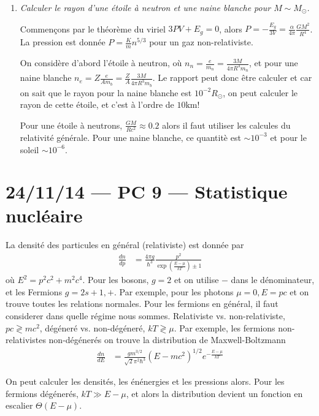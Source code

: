 \documentclass[10pt]{report}
\newcommand{\rd}[2]{\frac{d#1}{d#2}}
\begin{document}
\begin{enumerate}[1.]
    \item \emph{Calculer le rayon d'une \'etoile \`a neutron et une naine blanche pour $M \sim M_{\odot}$.}

        Commen\c{c}ons par le th\'eor\`eme du viriel $3PV + E_g = 0$, alors $P = -\frac{E_g}{3V} = \frac{\alpha}{4\pi}\frac{GM^2}{R^4}$. La pression est donn\'ee $P = \frac{K}{m}n^{5/3}$ pour un gaz non-relativiste.
        
        On consid\`ere d'abord l'\'etoile \`a neutron, o\`u $n_n = \frac{e}{m_n} = \frac{3M}{4\pi R^3 m_n}$, et pour une naine blanche $n_e = Z\frac{e}{Am_b} = \frac{Z}{A}\frac{3M}{4\pi R^3 m_b}$. Le rapport peut donc \^etre calculer et car on sait que le rayon pour la naine blanche est $10^{-2}R_{\odot}$, on peut calculer le rayon de cette \'etoile, et c'est \`a l'ordre de $10\mathrm{km}$!

        Pour une \'etoile \`a neutrons, $\frac{GM}{Rc^2} \approx 0.2$ alors il faut utiliser les calcules du relativit\'e g\'en\'erale. Pour une naine blanche, ce quantit\`e est $\sim 10^{-3}$ et pour le soleil $\sim10^{-6}$. 
\end{enumerate}
\chapter{24/11/14 --- PC 9 --- Statistique nucl\'eaire}

La densit\'e des particules en g\'en\'eral (relativiste) est donn\'ee par
\begin{align}
    \rd{n}{p} &= \frac{4\pi g}{\hbar^3}\frac{p^2}{\exp\left( \frac{E-\mu}{kT} \right) \pm 1}
\end{align}
o\`u $E^2 = p^2c^2 + m^2c^4$. Pour les bosons, $g=2$ et on utilise $-$ dans le d\'enominateur, et les Fermions $g=2s+1, +$. Par exemple, pour les photons $\mu = 0, E = pc$ et on trouve toutes les relations normales. Pour les fermions en g\'en\'eral, il faut considerer dans quelle r\'egime nous sommes. Relativiste vs. non-relativiste, $pc \gtrless mc^2$, d\'eg\'ener\'e vs. non-d\'eg\'ener\'e, $kT \gtrless \mu$. Par exemple, les fermions non-relativistes non-d\'eg\'ener\'es on trouve la distribution de Maxwell-Boltzmann
\begin{align}
    \rd{n}{E} &= \frac{gm^{3/2}}{\sqrt{2}\pi^2\hbar^3}\left( E-mc^2 \right)^{1/2}e^{-\frac{E - \mu}{kT}}
\end{align}

On peut calculer les densit\'es, les \'en\'energies et les pressions alors. Pour les fermions d\'eg\'ener\'es, $kT \gg E - \mu$, et alors la distribution devient un fonction en escalier $\Theta(E-\mu)$. 
\end{document}
